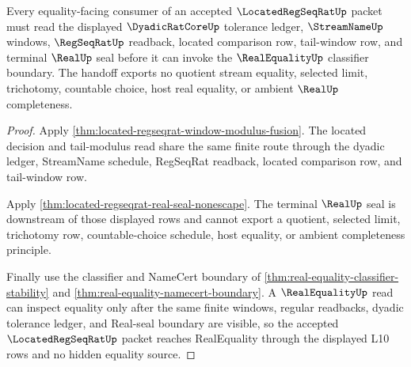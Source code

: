 \begin{theorem}
\label{thm:located-regseqrat-real-equality-handoff}
Every equality-facing consumer of an accepted $\LocatedRegSeqRatUp$ packet must read the displayed $\DyadicRatCoreUp$ tolerance ledger, $\StreamNameUp$ windows, $\RegSeqRatUp$ readback, located comparison row, tail-window row, and terminal $\RealUp$ seal before it can invoke the $\RealEqualityUp$ classifier boundary. The handoff exports no quotient stream equality, selected limit, trichotomy, countable choice, host real equality, or ambient $\RealUp$ completeness.
\end{theorem}
\begin{proof}
Apply \autoref{thm:located-regseqrat-window-modulus-fusion}. The located decision and tail-modulus read share the same finite route through the dyadic ledger, StreamName schedule, RegSeqRat readback, located comparison row, and tail-window row.

Apply \autoref{thm:located-regseqrat-real-seal-nonescape}. The terminal $\RealUp$ seal is downstream of those displayed rows and cannot export a quotient, selected limit, trichotomy row, countable-choice schedule, host equality, or ambient completeness principle.

Finally use the classifier and NameCert boundary of \autoref{thm:real-equality-classifier-stability} and \autoref{thm:real-equality-namecert-boundary}. A $\RealEqualityUp$ read can inspect equality only after the same finite windows, regular readbacks, dyadic tolerance ledger, and Real-seal boundary are visible, so the accepted $\LocatedRegSeqRatUp$ packet reaches RealEquality through the displayed L10 rows and no hidden equality source.
\end{proof}


\begin{closurestatus}{\LocatedRegSeqRatUp}
  \theoryclosure{\seedClosure}
  \formalstatus{\unformalizedV}
\end{closurestatus}
